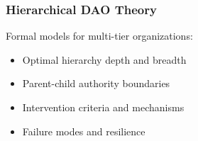 \subsubsection{Hierarchical DAO Theory}

Formal models for multi-tier organizations:
\begin{itemize}
    \item Optimal hierarchy depth and breadth
    \item Parent-child authority boundaries
    \item Intervention criteria and mechanisms
    \item Failure modes and resilience
\end{itemize}

